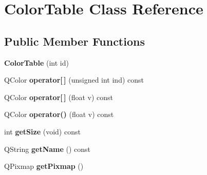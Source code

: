 \hypertarget{classColorTable}{
\section{ColorTable Class Reference}
\label{classColorTable}
}
\subsection*{Public Member Functions}
\begin{DoxyCompactItemize}
\item 
\hypertarget{classColorTable_ae5b19b123ecb3acb4e662d04956fc90b}{
{\bfseries ColorTable} (int id)}
\label{classColorTable_ae5b19b123ecb3acb4e662d04956fc90b}

\item 
\hypertarget{classColorTable_a8fd7de2e049ec21112dadbc010f59baa}{
QColor {\bfseries operator\mbox{[}$\,$\mbox{]}} (unsigned int ind) const }
\label{classColorTable_a8fd7de2e049ec21112dadbc010f59baa}

\item 
\hypertarget{classColorTable_a80833ea2abfa31e5d3e5a0dca2405196}{
QColor {\bfseries operator\mbox{[}$\,$\mbox{]}} (float v) const }
\label{classColorTable_a80833ea2abfa31e5d3e5a0dca2405196}

\item 
\hypertarget{classColorTable_ac22150b16622aa36c22732687440f2f3}{
QColor {\bfseries operator()} (float v) const }
\label{classColorTable_ac22150b16622aa36c22732687440f2f3}

\item 
\hypertarget{classColorTable_ab07e9473db44ac7f4c2acbef30d2ddc4}{
int {\bfseries getSize} (void) const }
\label{classColorTable_ab07e9473db44ac7f4c2acbef30d2ddc4}

\item 
\hypertarget{classColorTable_ae0e049ae7f0cb85bda9c50637379013b}{
QString {\bfseries getName} () const }
\label{classColorTable_ae0e049ae7f0cb85bda9c50637379013b}

\item 
\hypertarget{classColorTable_aa997a020f39e10ada5056a69364172db}{
QPixmap {\bfseries getPixmap} ()}
\label{classColorTable_aa997a020f39e10ada5056a69364172db}

\end{DoxyCompactItemize}

